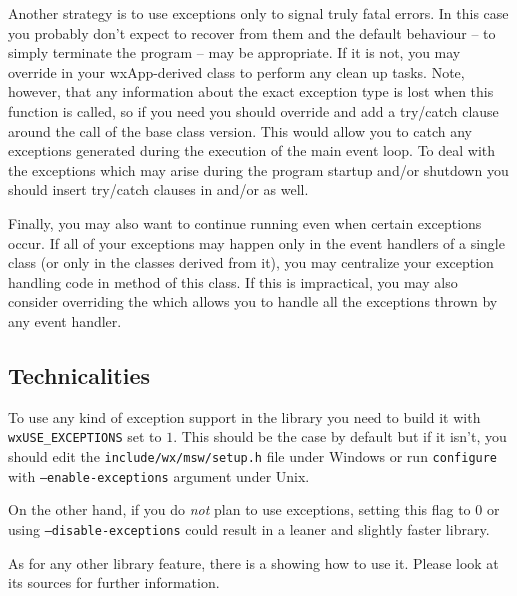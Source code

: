 Another strategy is to use exceptions only to signal truly fatal errors. In
this case you probably don't expect to recover from them and the default
behaviour -- to simply terminate the program -- may be appropriate. If it is
not, you may override  
in your wxApp-derived class to perform any clean up tasks. Note, however, that
any information about the exact exception type is lost when this function is
called, so if you need you should override  and
add a try/catch clause around the call of the base class version. This would
allow you to catch any exceptions generated during the execution of the main
event loop. To deal with the exceptions which may arise during the program
startup and/or shutdown you should insert try/catch clauses in 
 and/or  as well.

Finally, you may also want to continue running even when certain exceptions
occur. If all of your exceptions may happen only in the event handlers of a
single class (or only in the classes derived from it), you may centralize your
exception handling code in  
method of this class. If this is impractical, you may also consider overriding
the  which allows you to handle
all the exceptions thrown by any event handler.


\subsection{Technicalities}\label{exceptionstechnicalities}

To use any kind of exception support in the library you need to build it with 
\texttt{wxUSE\_EXCEPTIONS} set to $1$. This should be the case by default but
if it isn't, you should edit the \texttt{include/wx/msw/setup.h} file under
Windows or run \texttt{configure} with \texttt{--enable-exceptions} argument
under Unix.

On the other hand, if you do \emph{not} plan to use exceptions, setting this
flag to $0$ or using \texttt{--disable-exceptions} could result in a leaner and
slightly faster library.

As for any other library feature, there is a  
showing how to use it. Please look at its sources for further information.


